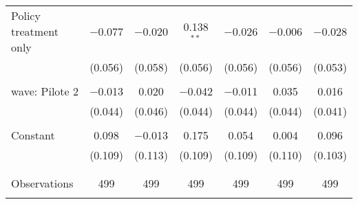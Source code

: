 \begin{tabular}{@{\extracolsep{5pt}}lcccccc}
 Policy treatment only & $-$0.077 & $-$0.020 & 0.138$^{**}$ & $-$0.026 & $-$0.006 & $-$0.028 \\ 
  & (0.056) & (0.058) & (0.056) & (0.056) & (0.056) & (0.053) \\ 
  & & & & & & \\ 
 wave: Pilote 2 & $-$0.013 & 0.020 & $-$0.042 & $-$0.011 & 0.035 & 0.016 \\ 
  & (0.044) & (0.046) & (0.044) & (0.044) & (0.044) & (0.041) \\ 
  & & & & & & \\ 
 Constant & 0.098 & $-$0.013 & 0.175 & 0.054 & 0.004 & 0.096 \\ 
  & (0.109) & (0.113) & (0.109) & (0.109) & (0.110) & (0.103) \\ 
  & & & & & & \\ 
\hline \\[-1.8ex] 

Observations & 499 & 499 & 499 & 499 & 499 & 499 \\ 
\hline 
\hline \\[-1.8ex] 
\end{tabular} 